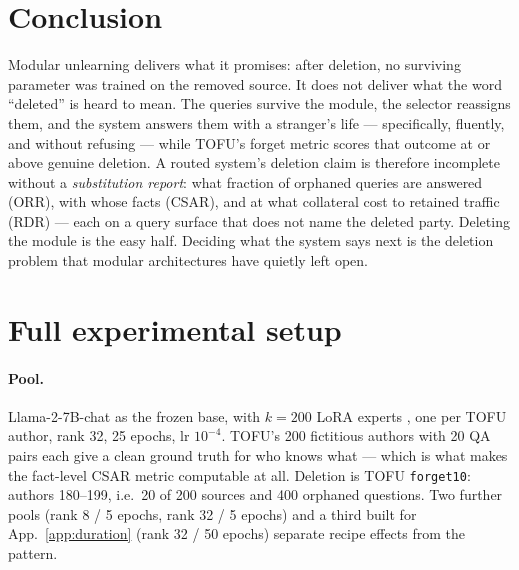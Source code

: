 \documentclass{article}
\newcommand{\csar}{CSAR}
\newcommand{\orr}{ORR}
\newcommand{\rdr}{RDR}
\begin{document}
\section{Conclusion}

Modular unlearning delivers what it promises: after deletion, no surviving parameter was trained on
the removed source. It does not deliver what the word ``deleted'' is heard to mean. The queries
survive the module, the selector reassigns them, and the system answers them with a stranger's life
--- specifically, fluently, and without refusing --- while TOFU's forget metric scores that outcome
at or above genuine deletion. A routed system's deletion claim is therefore incomplete without a
\emph{substitution report}: what fraction of orphaned queries are answered (\orr{}), with whose
facts (\csar{}), and at what collateral cost to retained traffic (\rdr{}) --- each on a query
surface that does not name the deleted party. Deleting the module is the easy half. Deciding what
the system says next is the deletion problem that modular architectures have quietly left open.

\label{end-of-body}




\appendix
\newpage

\section{Full experimental setup}
\label{app:setup}

\paragraph{Pool.} Llama-2-7B-chat as the frozen base, with $k=200$ LoRA experts
\citep{hu2022lora}, one per TOFU author, rank 32, 25 epochs, lr $10^{-4}$. TOFU's 200 fictitious
authors with 20 QA pairs each give a clean ground truth for who knows what --- which is what makes
the fact-level \csar{} metric computable at all. Deletion is TOFU \texttt{forget10}: authors
180--199, i.e.\ 20 of 200 sources and 400 orphaned questions. Two further pools (rank 8 / 5 epochs,
rank 32 / 5 epochs) and a third built for App.~\ref{app:duration} (rank 32 / 50 epochs) separate
recipe effects from the pattern.
\end{document}
